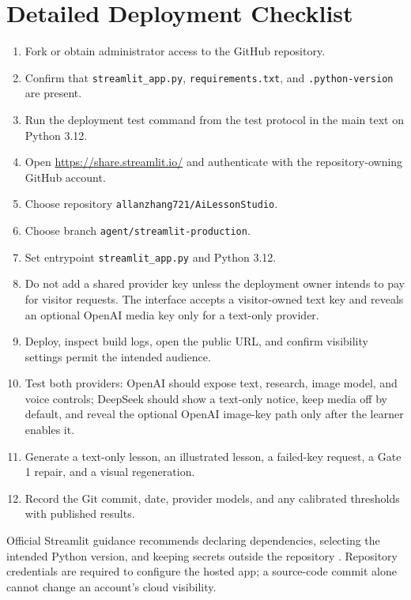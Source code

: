 \documentclass[11pt]{article}
\newcommand{\code}[1]{\texttt{#1}}
\theoremstyle{plain}
\theoremstyle{definition}
\begin{document}
\section{Detailed Deployment Checklist}

\begin{enumerate}
  \item Fork or obtain administrator access to the GitHub repository.
  \item Confirm that \code{streamlit\_app.py}, \code{requirements.txt}, and \code{.python-version} are present.
  \item Run the deployment test command from the test protocol in the main text on Python 3.12.
  \item Open \url{https://share.streamlit.io/} and authenticate with the repository-owning GitHub account.
  \item Choose repository \code{allanzhang721/AiLessonStudio}.
  \item Choose branch \code{agent/streamlit-production}.
  \item Set entrypoint \code{streamlit\_app.py} and Python 3.12.
  \item Do not add a shared provider key unless the deployment owner intends to pay for visitor requests. The interface accepts a visitor-owned text key and reveals an optional OpenAI media key only for a text-only provider.
  \item Deploy, inspect build logs, open the public URL, and confirm visibility settings permit the intended audience.
  \item Test both providers: OpenAI should expose text, research, image model, and voice controls; DeepSeek should show a text-only notice, keep media off by default, and reveal the optional OpenAI image-key path only after the learner enables it.
  \item Generate a text-only lesson, an illustrated lesson, a failed-key request, a Gate 1 repair, and a visual regeneration.
  \item Record the Git commit, date, provider models, and any calibrated thresholds with published results.
\end{enumerate}

Official Streamlit guidance recommends declaring dependencies, selecting the intended Python version, and keeping secrets outside the repository \citep{streamlitDeploy,streamlitSecrets}. Repository credentials are required to configure the hosted app; a source-code commit alone cannot change an account's cloud visibility.
\end{document}
